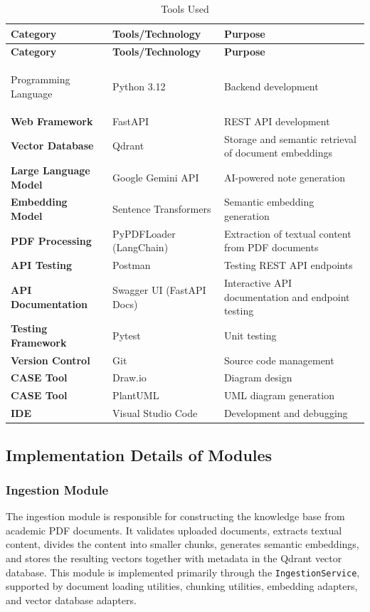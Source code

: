 \begin{xltabular}{\textwidth}{|>{\bfseries}p{3.5cm}|X|X|}
    \caption{Tools Used} \\
        \hline
        \textbf{Category} & \textbf{Tools/Technology} & \textbf{Purpose} \\
        \hline
        \endfirsthead

        \hline
        \textbf{Category} & \textbf{Tools/Technology} & \textbf{Purpose} \\
        \hline
        \endhead

        Programming Language & Python 3.12 & Backend development \\
        \hline
        Web Framework & FastAPI & REST API development \\
        \hline
        Vector Database & Qdrant & Storage and semantic retrieval of document embeddings \\
        \hline
        Large Language Model & Google Gemini API & AI-powered note generation \\
        \hline
        Embedding Model & Sentence Transformers & Semantic embedding generation\\
        \hline
        PDF Processing & PyPDFLoader (LangChain) & Extraction of textual content from PDF documents \\
        \hline
        API Testing & Postman & Testing REST API endpoints \\
        \hline
        API Documentation & Swagger UI (FastAPI Docs) & Interactive API documentation and endpoint testing \\
        \hline
        Testing Framework & Pytest & Unit testing \\
        \hline
        Version Control & Git & Source code management \\
        \hline
        CASE Tool & Draw.io & Diagram design \\
        \hline
        CASE Tool & PlantUML & UML diagram generation \\
        \hline
        IDE & Visual Studio Code & Development and debugging \\     
        \hline
\end{xltabular}

\subsection{Implementation Details of Modules}

\subsubsection{Ingestion Module}
The ingestion module is responsible for constructing the knowledge base from academic PDF documents. It validates uploaded documents, extracts textual content, divides the content into smaller chunks, generates semantic embeddings, and stores the resulting vectors together with metadata in the Qdrant vector database. This module is implemented primarily through the \texttt{IngestionService}, supported by document loading utilities, chunking utilities, embedding adapters, and vector database adapters. \par


